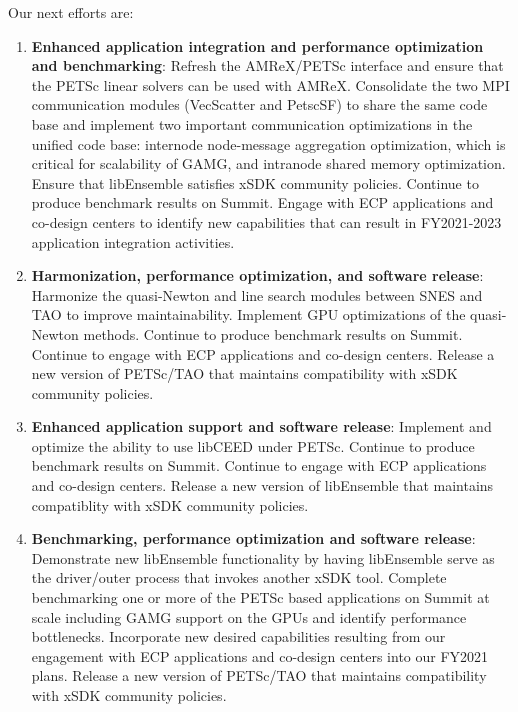 Our next efforts are:
\begin{enumerate}
  \item \textbf{Enhanced application integration and performance optimization and benchmarking}:
  Refresh the AMReX/PETSc interface and ensure that the PETSc linear solvers can be used with AMReX.
  Consolidate the two MPI communication modules (VecScatter and PetscSF) to share the same code base 
  and implement two important communication optimizations in the unified code base: internode node-message 
  aggregation optimization, which is critical for scalability of GAMG, and intranode shared memory 
  optimization.  
  Ensure that libEnsemble satisfies xSDK community policies.
  Continue to produce benchmark results on Summit.
  Engage with ECP applications and co-design centers to identify new capabilities that can result in 
  FY2021-2023 application integration activities.
  \item \textbf{Harmonization, performance optimization, and software release}:
  Harmonize the quasi-Newton and line search modules between SNES and TAO to improve maintainability.
  Implement GPU optimizations of the quasi-Newton methods.
  Continue to produce benchmark results on Summit.
  Continue to engage with ECP applications and co-design centers.
  Release a new version of PETSc/TAO that maintains compatibility with xSDK community policies.
  \item \textbf{Enhanced application support and software release}:
  Implement and optimize the ability to use libCEED under PETSc.
  Continue to produce benchmark results on Summit.
  Continue to engage with ECP applications and co-design centers.
  Release a new version of libEnsemble that maintains compatiblity with xSDK community policies.
  \item \textbf{Benchmarking, performance optimization and software release}:
  Demonstrate new libEnsemble functionality by having libEnsemble serve as the driver/outer process that 
  invokes another xSDK tool.
  Complete benchmarking one or more of the PETSc based applications on Summit at scale including GAMG support 
  on the GPUs and identify performance bottlenecks.
  Incorporate new desired capabilities resulting from our engagement with ECP applications and co-design centers into our FY2021 plans.
  Release a new version of PETSc/TAO that maintains compatibility with xSDK community policies.
\end{enumerate}

